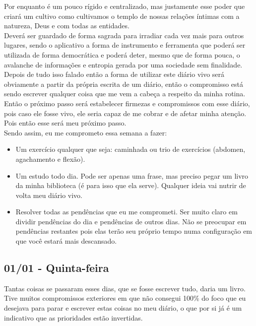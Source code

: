 \documentclass[11pt]{article}
\begin{document}
Por enquanto é um pouco rígido e centralizado, mas justamente esse poder que criará um cultivo como cultivamos o templo de nossas relações íntimas com a natureza, Deus e com todas as entidades.\\

Deverá ser guardado de forma sagrada para irradiar cada vez mais para outros lugares, sendo o aplicativo a forma de instrumento e ferramenta que poderá ser utilizada de forma democrática e poderá deter, mesmo que de forma pouca, o avalanche de informações e entropia gerada por uma sociedade sem finalidade.\\

Depois de tudo isso falado então a forma de utilizar este diário vivo será obviamente a partir da própria escrita de um diário, então o compromisso está sendo escrever qualquer coisa que me vem a cabeça a respeito da minha rotina.\\

Então o próximo passo será estabelecer firmezas e compromissos com esse diário, pois caso ele fosse vivo, ele seria capaz de me cobrar e de afetar minha atenção. Pois então esse será meu próximo passo.\\

Sendo assim, eu me comprometo essa semana a fazer:


\begin{itemize}
    \item Um exercício qualquer que seja: caminhada ou trio de exercícios (abdomen, agachamento e flexão).
    \item Um estudo todo dia. Pode ser apenas uma frase, mas preciso pegar um livro da minha biblioteca (é para isso que ela serve). Qualquer ideia vai nutrir de volta meu diário vivo.
    \item Resolver todas as pendências que eu me comprometi. Ser muito claro em dividir pendências do dia e pendências de outros dias. Não se preocupar em pendências restantes pois elas terão seu próprio tempo numa configuração em que você estará mais descansado.
\end{itemize}

\subsection{01/01 - Quinta-feira}

Tantas coisas se passaram esses dias, que se fosse escrever tudo, daria um livro.\\

Tive muitos compromissos exteriores em que não consegui 100\% do foco que eu desejava para parar e escrever estas coisas no meu diário, o que por si já é um indicativo que as prioridades estão invertidas.\\
\end{document}
